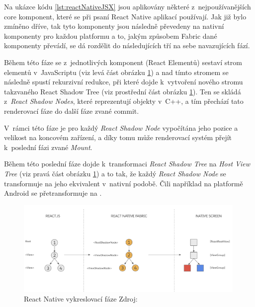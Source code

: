Na ukázce kódu \ref{lst:reactNativeJSX} jsou aplikovány některé z~nejpoužívanějších core komponent, které se při psaní React
Native aplikací používají. \cite{reactNativeComponents} Jak již bylo zmíněno dříve, tak tyto komponenty jsou následně převedeny 
na nativní komponenty pro každou platformu a to, jakým způsobem Fabric dané komponenty převádí, se dá rozdělit do následujících tří
na sebe navazujících fází. \cite{reactNativeRenderCommitMount}
 

\smallskip

Během této fáze se z~jednotlivých komponent (React Elementů) sestaví strom elementů v~JavaScriptu (viz levá část obrázku \ref{fig:react-native-render-pipeline}) a nad tímto stromem se 
následně spustí rekurzivní redukce, při které dojde k~vytvoření nového stromu takzvaného React Shadow Tree (viz prostřední část obrázku \ref{fig:react-native-render-pipeline}).
\cite{reactNativeRenderCommitMount} Ten se skládá z~\textit{React Shadow Nodes}, které reprezentují objekty v~C++, a tím přechází tato renderovací fáze do další fáze zvané commit.\cite{reactNativeRenderCommitMount}

V~rámci této fáze je pro každý \textit{React Shadow Node} vypočítána jeho pozice a velikost na koncovém zařízení, a díky tomu může renderovací systém
přejít k~poslední fázi zvané \textit{Mount}. \cite{reactNativeRenderCommitMount}

Během této poslední fáze dojde k~transformaci \textit{React Shadow Tree} na \textit{Host View Tree} (viz pravá část obrázku \ref{fig:react-native-render-pipeline}) a to tak, že každý \textit{React Shadow Node}
se transformuje na jeho ekvivalent v~nativní podobě. \cite{reactNativeRenderCommitMount} Čili například na platformě Android se  přetransformuje na . \cite{reactNativeRenderCommitMount}

\begin{figure}[H]
  \centering
  \includegraphics[width=0.99\textwidth]{react-native-render-pipeline.png}
  \caption{React Native vykreslovací fáze Zdroj: \cite{reactNativeRenderCommitMount}}
  \label{fig:react-native-render-pipeline}
\end{figure}


